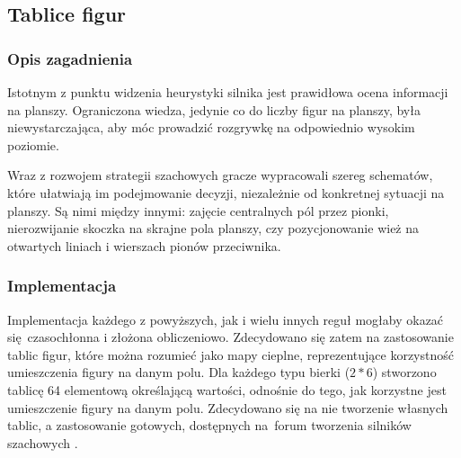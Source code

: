 \subsection{Tablice figur}
\label{subsec:tablice-figur}

\subsubsection{Opis zagadnienia}
Istotnym z punktu widzenia heurystyki silnika jest prawidłowa ocena informacji na planszy.
Ograniczona wiedza, jedynie co do liczby figur na planszy, była niewystarczająca, aby móc prowadzić rozgrywkę na odpowiednio wysokim poziomie.

Wraz z rozwojem strategii szachowych gracze wypracowali szereg schematów, które ułatwiają im podejmowanie decyzji, niezależnie od konkretnej sytuacji na planszy.
Są nimi między innymi: zajęcie centralnych pól przez pionki, nierozwijanie skoczka na skrajne pola planszy, czy pozycjonowanie wież na otwartych liniach i wierszach pionów przeciwnika.

\subsubsection{Implementacja}
Implementacja każdego z powyższych, jak i wielu innych reguł mogłaby okazać się~czasochłonna i złożona obliczeniowo.
Zdecydowano się zatem na zastosowanie tablic figur, które można rozumieć jako mapy cieplne, reprezentujące korzystność umieszczenia figury na danym polu.
Dla każdego typu bierki ($2*6$) stworzono tablicę 64 elementową określającą wartości, odnośnie do tego, jak korzystne jest umieszczenie figury na danym polu.
Zdecydowano się na nie tworzenie własnych tablic, a zastosowanie gotowych, dostępnych na~forum tworzenia silników szachowych \cite*{wiki-tablica-figur}.

